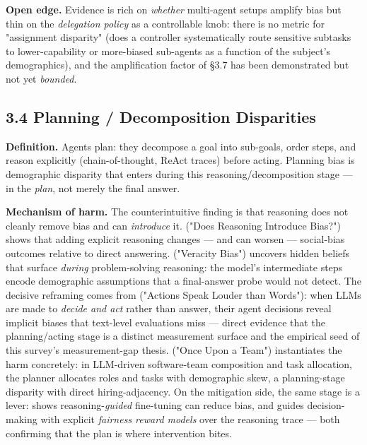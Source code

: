 \documentclass[sigconf,nonacm]{acmart}
\begin{document}
\textbf{Open edge.} Evidence is rich on \emph{whether} multi-agent setups amplify bias but thin on the \emph{delegation policy} as a controllable knob: there is no metric for "assignment disparity" (does a controller systematically route sensitive subtasks to lower-capability or more-biased sub-agents as a function of the subject's demographics), and the amplification factor of §3.7 has been demonstrated but not yet \emph{bounded}.

\subsection{3.4 Planning / Decomposition Disparities}

\textbf{Definition.} Agents plan: they decompose a goal into sub-goals, order steps, and reason explicitly (chain-of-thought, ReAct traces) before acting. Planning bias is demographic disparity that enters during this reasoning/decomposition stage — in the \emph{plan}, not merely the final answer.

\textbf{Mechanism of harm.} The counterintuitive finding is that reasoning does not cleanly remove bias and can \emph{introduce} it. \cite{wu2025reasoning} ("Does Reasoning Introduce Bias?") shows that adding explicit reasoning changes — and can worsen — social-bias outcomes relative to direct answering. \cite{zhou2025veracity} ("Veracity Bias") uncovers hidden beliefs that surface \emph{during} problem-solving reasoning: the model's intermediate steps encode demographic assumptions that a final-answer probe would not detect. The decisive reframing comes from \cite{li2025actions} ("Actions Speak Louder than Words"): when LLMs are made to \emph{decide and act} rather than answer, their agent decisions reveal implicit biases that text-level evaluations miss — direct evidence that the planning/acting stage is a distinct measurement surface and the empirical seed of this survey's measurement-gap thesis. \cite{parziale2026once} ("Once Upon a Team") instantiates the harm concretely: in LLM-driven software-team composition and task allocation, the planner allocates roles and tasks with demographic skew, a planning-stage disparity with direct hiring-adjacency. On the mitigation side, the same stage is a lever: \cite{kabra2025reasoning} shows reasoning-\emph{guided} fine-tuning can reduce bias, and \cite{hall2025guiding} guides decision-making with explicit \emph{fairness reward models} over the reasoning trace — both confirming that the plan is where intervention bites.
\end{document}
